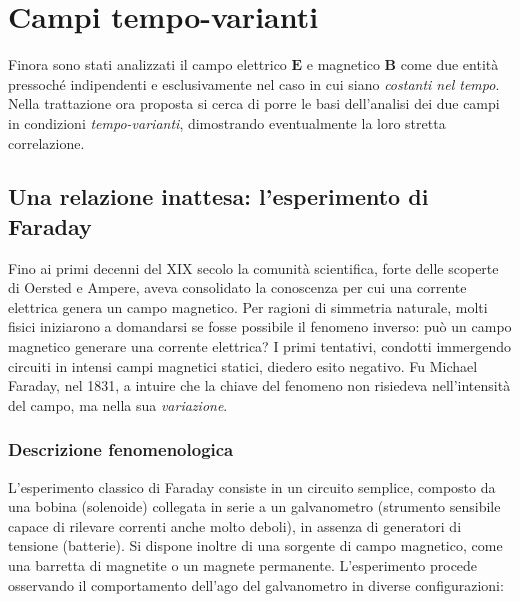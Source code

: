 \documentclass[a4paper,11pt]{report}
\begin{document}
\chapter{Campi tempo-varianti}
Finora sono stati analizzati il campo elettrico $\bm{E}$ e magnetico $\bm{B}$ come due entità pressoché indipendenti e esclusivamente nel caso in cui siano \textit{costanti nel tempo}. Nella trattazione ora proposta si cerca di porre le basi dell'analisi dei due campi in condizioni \textit{tempo-varianti}, dimostrando eventualmente la loro stretta correlazione. 

\section{Una relazione inattesa: l'esperimento di Faraday}

Fino ai primi decenni del XIX secolo la comunità scientifica, forte delle scoperte di Oersted e Ampere, aveva consolidato la conoscenza per cui una corrente elettrica genera un campo magnetico. Per ragioni di simmetria naturale, molti fisici iniziarono a domandarsi se fosse possibile il fenomeno inverso: può un campo magnetico generare una corrente elettrica?
I primi tentativi, condotti immergendo circuiti in intensi campi magnetici statici, diedero esito negativo. Fu Michael Faraday, nel 1831, a intuire che la chiave del fenomeno non risiedeva nell'intensità del campo, ma nella sua \textit{variazione}.

\subsection{Descrizione fenomenologica}
L'esperimento classico di Faraday consiste in un circuito semplice, composto da una bobina (solenoide) collegata in serie a un galvanometro (strumento sensibile capace di rilevare correnti anche molto deboli), in assenza di generatori di tensione (batterie).
Si dispone inoltre di una sorgente di campo magnetico, come una barretta di magnetite o un magnete permanente. L'esperimento procede osservando il comportamento dell'ago del galvanometro in diverse configurazioni:
\end{document}
